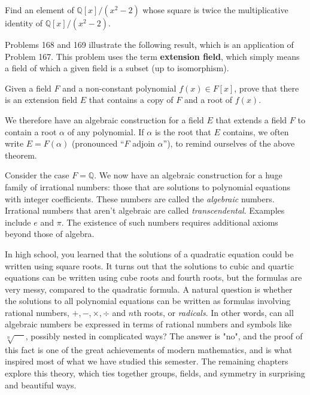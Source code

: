 \begin{problem}
Find an element of \(\mathbb{Q}[x]/(x^2-2)\) whose square is twice the multiplicative identity of \(\mathbb{Q}[x]/(x^2-2)\).
\end{problem}

Problems 168 and 169 illustrate the following result, which is an application of Problem 167. This problem uses the term \textbf{extension field}, which simply means a field of which a given field is a subset (up to isomorphism).

\begin{problem}
Given a field \(F\) and a non-constant polynomial \(f(x) \in F[x]\), prove that there is an extension field \(E\) that contains a copy of \(F\) and a root of \(f(x)\).
\end{problem}

We therefore have an algebraic construction for a field \(E\) that extends a field \(F\) to contain a root \(\alpha\) of any polynomial. If \(\alpha\) is the root that \(E\) contains, we often write \(E = F(\alpha)\) (pronounced ``\(F\) adjoin \(\alpha\)''), to remind ourselves of the above theorem.

Consider the case \(F = \mathbb{Q}\). We now have an algebraic construction for a huge family of irrational numbers: those that are solutions to polynomial equations with integer coefficients. These numbers are called the \textit{algebraic} numbers. Irrational numbers that aren't algebraic are called \textit{transcendental}. Examples include \(e\) and \(\pi\). The existence of such numbers requires additional axioms beyond those of algebra.

In high school, you learned that the solutions of a quadratic equation could be written using square roots. It turns out that the solutions to cubic and quartic equations can be written using cube roots and fourth roots, but the formulas are very messy, compared to the quadratic formula. A natural question is whether the solutions to all polynomial equations can be written as formulas involving rational numbers, $+,-,\times,\div$ and $n$th roots, or \textit{radicals}. In other words, can all algebraic numbers be expressed in terms of rational numbers and symbols like \(\sqrt[n]{\phantom{xx}}\), possibly nested in complicated ways? The answer is "no", and the proof of this fact is one of the great achievements of modern mathematics, and is what inspired most of what we have studied this semester. The remaining chapters explore this theory, which ties together groups, fields, and symmetry in surprising and beautiful ways.


